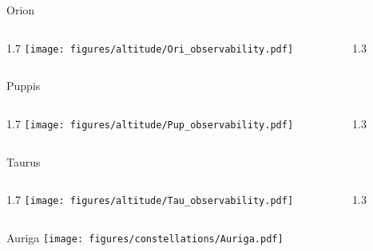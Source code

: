 \documentclass[final]{beamer}
\newlength{\colwidth}
\begin{document}
\begin{frame}[t]{}

  \Large{Orion}
  \begin{columns}[T]
      \begin{column}{1.7\colwidth}
          \centering
          \texttt{[image: figures/altitude/Ori\_observability.pdf]}
      \end{column}
      \begin{column}{1.3\colwidth}
      \Large
      
      \end{column}
  \end{columns}

  \Large{Puppis}
  \begin{columns}[T]
      \begin{column}{1.7\colwidth}
          \centering
          \texttt{[image: figures/altitude/Pup\_observability.pdf]}
      \end{column}
      \begin{column}{1.3\colwidth}
          \Large
          
      \end{column}
  \end{columns}

  \Large{Taurus}
  \begin{columns}[T]
      \begin{column}{1.7\colwidth}
          \centering
          \texttt{[image: figures/altitude/Tau\_observability.pdf]}
      \end{column}
      \begin{column}{1.3\colwidth}
          \Large
          
      \end{column}
  \end{columns}
\end{frame}


\begin{frame}[t]{\LARGE Auriga}
    \centering
    \texttt{[image: figures/constellations/Auriga.pdf]}
\end{frame}

\end{document}
